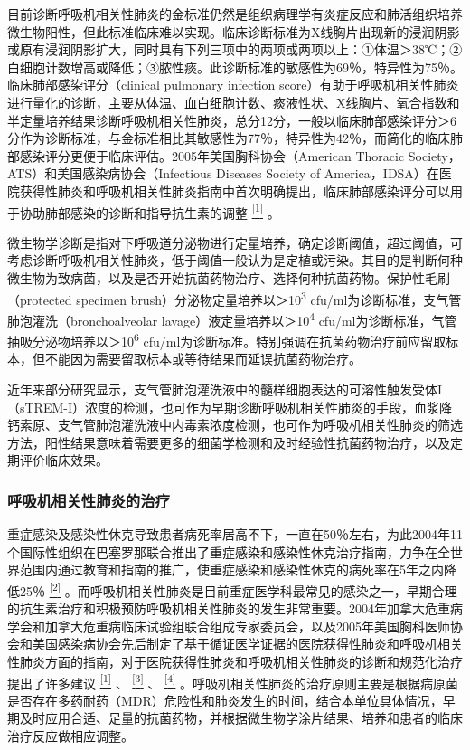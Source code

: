 目前诊断呼吸机相关性肺炎的金标准仍然是组织病理学有炎症反应和肺活组织培养微生物阳性，但此标准临床难以实现。临床诊断标准为X线胸片出现新的浸润阴影或原有浸润阴影扩大，同时具有下列三项中的两项或两项以上：①体温＞38℃；②白细胞计数增高或降低；③脓性痰。此诊断标准的敏感性为69％，特异性为75％。临床肺部感染评分（clinical
pulmonary infection
score）有助于呼吸机相关性肺炎进行量化的诊断，主要从体温、血白细胞计数、痰液性状、X线胸片、氧合指数和半定量培养结果诊断呼吸机相关性肺炎，总分12分，一般以临床肺部感染评分＞6分作为诊断标准，与金标准相比其敏感性为77％，特异性为42％，而简化的临床肺部感染评分更便于临床评估。2005年美国胸科协会（American
Thoracic Society，ATS）和美国感染病协会（Infectious Diseases Society of
America，IDSA）在医院获得性肺炎和呼吸机相关性肺炎指南中首次明确提出，临床肺部感染评分可以用于协助肺部感染的诊断和指导抗生素的调整
\protect\hyperlink{text00014.htmlux5cux23ch1-13}{\textsuperscript{{[}1{]}}}
。

微生物学诊断是指对下呼吸道分泌物进行定量培养，确定诊断阈值，超过阈值，可考虑诊断呼吸机相关性肺炎，低于阈值一般认为是定植或污染。其目的是判断何种微生物为致病菌，以及是否开始抗菌药物治疗、选择何种抗菌药物。保护性毛刷（protected
specimen brush）分泌物定量培养以＞10\textsuperscript{3}
cfu/ml为诊断标准，支气管肺泡灌洗（bronchoalveolar
lavage）液定量培养以＞10\textsuperscript{4}
cfu/ml为诊断标准，气管抽吸分泌物培养以＞10\textsuperscript{6}
cfu/ml为诊断标准。特别强调在抗菌药物治疗前应留取标本，但不能因为需要留取标本或等待结果而延误抗菌药物治疗。

近年来部分研究显示，支气管肺泡灌洗液中的髓样细胞表达的可溶性触发受体I（sTREM-I）浓度的检测，也可作为早期诊断呼吸机相关性肺炎的手段，血浆降钙素原、支气管肺泡灌洗液中内毒素浓度检测，也可作为呼吸机相关性肺炎的筛选方法，阳性结果意味着需要更多的细菌学检测和及时经验性抗菌药物治疗，以及定期评价临床效果。

\subsubsection{呼吸机相关性肺炎的治疗}

重症感染及感染性休克导致患者病死率居高不下，一直在50％左右，为此2004年11个国际性组织在巴塞罗那联合推出了重症感染和感染性休克治疗指南，力争在全世界范围内通过教育和指南的推广，使重症感染和感染性休克的病死率在5年之内降低25％
\protect\hyperlink{text00014.htmlux5cux23ch2-13}{\textsuperscript{{[}2{]}}}
。而呼吸机相关性肺炎是目前重症医学科最常见的感染之一，早期合理的抗生素治疗和积极预防呼吸机相关性肺炎的发生非常重要。2004年加拿大危重病学会和加拿大危重病临床试验组联合组成专家委员会，以及2005年美国胸科医师协会和美国感染病协会先后制定了基于循证医学证据的医院获得性肺炎和呼吸机相关性肺炎方面的指南，对于医院获得性肺炎和呼吸机相关性肺炎的诊断和规范化治疗提出了许多建议
\protect\hyperlink{text00014.htmlux5cux23ch1-13}{\textsuperscript{{[}1{]}}}
、
\protect\hyperlink{text00014.htmlux5cux23ch3-13}{\textsuperscript{{[}3{]}}}
、
\protect\hyperlink{text00014.htmlux5cux23ch4-13}{\textsuperscript{{[}4{]}}}
。呼吸机相关性肺炎的治疗原则主要是根据病原菌是否存在多药耐药（MDR）危险性和肺炎发生的时间，结合本单位具体情况，早期及时应用合适、足量的抗菌药物，并根据微生物学涂片结果、培养和患者的临床治疗反应做相应调整。

